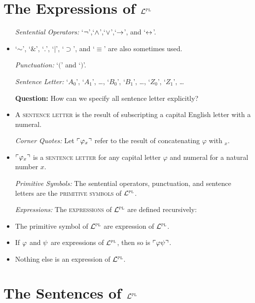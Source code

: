 \documentclass[a4paper, 11pt]{article} %
\begin{document}
\section*{The Expressions of $\mathcal{L}^{\textsc{pl}}$}

\begin{itemize}[leftmargin=1.5in,labelsep=.15in] %
  \item[\it Sentential Operators:] `$\neg$',`$\wedge$',`$\vee$',`$\rightarrow$', and `$\leftrightarrow$'.
    \item `$\sim$', `$\&$', `$.$', `$|$', `$\supset$', and `$\equiv$' are also sometimes used.
  \item[\it Punctuation:] `$($' and `$)$'.
  \item[\it Sentence Letter:] `$A_0$', `$A_1$', \ldots, `$B_0$', `$B_1$', \ldots, `$Z_0$', `$Z_1$', \ldots
  \item[\bf Question:] How can we specify all sentence letter explicitly?
    \item A \textsc{sentence letter} is the result of subscripting a capital English letter with a numeral.
  \item[\it Corner Quotes:] Let $\ulcorner\varphi_x\urcorner$ refer to the result of concatenating $\varphi$ with $_x$.
    \item $\ulcorner\varphi_x\urcorner$ is a \textsc{sentence letter} for any capital letter $\varphi$ and numeral for a natural number $x$. 
  \item[\it Primitive Symbols:] The sentential operators, punctuation, and sentence letters are the \textsc{primitive symbols} of $\mathcal{L}^{\textsc{pl}}$.
  \item[\it Expressions:] The \textsc{expressions} of $\mathcal{L}^{\textsc{pl}}$ are defined recursively: 
    \item The primitive symbol of $\mathcal{L}^{\textsc{pl}}$ are expression of $\mathcal{L}^{\textsc{pl}}$.
    \item If $\varphi$ and $\psi$ are expressions of $\mathcal{L}^{\textsc{pl}}$, then so is $\ulcorner\varphi\psi\urcorner$.
    \item Nothing else is an expression of $\mathcal{L}^{\textsc{pl}}$.
\end{itemize}





\section*{The Sentences of $\mathcal{L}^{\textsc{pl}}$}
\end{document}
